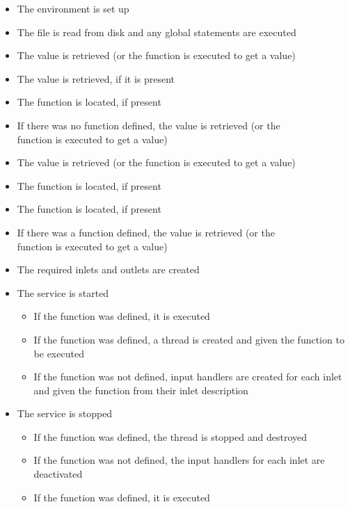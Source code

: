 \begin{itemize}
\item The \CL{} environment is set up
\item\exSp{}The \CL{} file is read from disk and any global statements are executed
\item\exSp{}The  value is retrieved (or the
 function is executed to get a value)
\item\exSp{}The  value is retrieved, if it is present
\item\exSp{}The  function is located, if present
\item\exSp{}If there was no  function defined, the
 value is retrieved (or the\\
 function is executed to get a value)
\item\exSp{}The  value is retrieved (or the
 function is executed to get a value)
\item\exSp{}The  function is located, if present
\item\exSp{}The  function is located, if present
\item\exSp{}If there was a  function defined, the
 value is retrieved (or the\\
 function is executed to get a value)
\item\exSp{}The required inlets and outlets are created
\item\exSp{}The service is started
\begin{itemize}
\item If the  function was defined, it is executed
\item\exSp{}If the  function was defined, a thread is created and
given the  function to be executed
\item\exSp{}If the  function was not defined, input handlers are
created for each inlet and given the  function from their inlet
description
\end{itemize}
\item\exSp{}The service is stopped
\begin{itemize}
\item If the  function was defined, the thread is stopped and
destroyed
\item\exSp{}If the  function was not defined, the input handlers
for each inlet are deactivated
\item\exSp{}If the  function was defined, it is executed
\end{itemize}
\end{itemize}
\secondaryEnd
\appendixEnd{}
